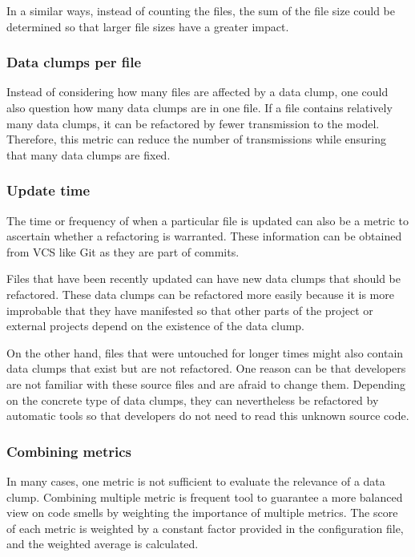 In a similar ways, instead of counting the files, the sum of the file size could be determined so that larger file sizes have a greater impact.

\subsubsection{Data clumps per file}

Instead of considering how many files are affected by a data clump, one could also question how many data clumps are in one file. If a file contains relatively many data clumps, it can be refactored by fewer transmission to the model. Therefore, this metric can reduce the number of transmissions while ensuring that many data clumps are fixed. 

\subsubsection{Update time}

The time or frequency of when a particular file is updated can also be a metric to ascertain whether a refactoring is warranted. These information can be obtained from \ac{VCS} like Git as they are part of commits.

Files that have been recently updated can have new data clumps that should be refactored. These data clumps can be refactored more easily because it is more improbable that they have manifested so that other parts of the project or external projects depend on the existence of the data clump. 

On the other hand, files that were untouched for longer times might also contain data clumps that exist but are not refactored. One reason can be that developers are not familiar with these source files and are afraid to change them. Depending on the concrete type of data clumps, they can nevertheless be refactored by automatic tools so that developers do not need to read this unknown source code.


\subsubsection{Combining metrics}

In many cases, one metric is not sufficient to evaluate the relevance of a data clump. Combining multiple metric is frequent tool to guarantee a more balanced view on code smells by weighting the importance of multiple metrics. The score of each metric is weighted by a constant factor provided in the configuration file, and the weighted average is calculated. 

